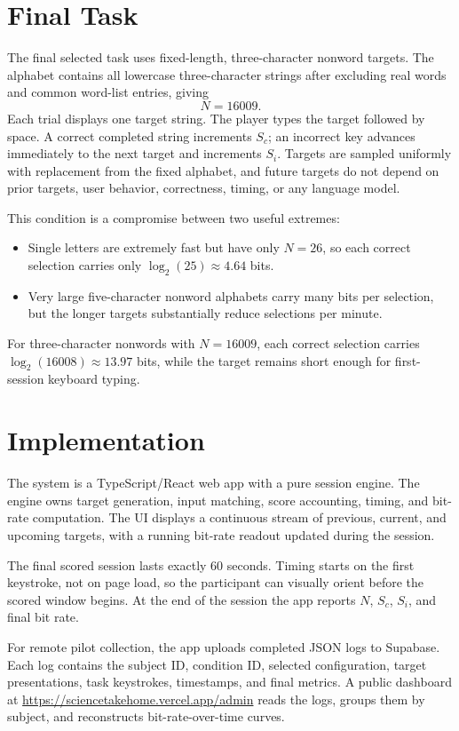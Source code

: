 \documentclass[11pt]{article}
\begin{document}
\section{Final Task}

The final selected task uses fixed-length, three-character nonword targets. The alphabet contains all lowercase three-character strings after excluding real words and common word-list entries, giving
\[
N = 16009.
\]
Each trial displays one target string. The player types the target followed by space. A correct completed string increments \(S_c\); an incorrect key advances immediately to the next target and increments \(S_i\). Targets are sampled uniformly with replacement from the fixed alphabet, and future targets do not depend on prior targets, user behavior, correctness, timing, or any language model.

This condition is a compromise between two useful extremes:
\begin{itemize}
  \item Single letters are extremely fast but have only \(N=26\), so each correct selection carries only \(\log_2(25)\approx4.64\) bits.
  \item Very large five-character nonword alphabets carry many bits per selection, but the longer targets substantially reduce selections per minute.
\end{itemize}
For three-character nonwords with \(N=16009\), each correct selection carries \(\log_2(16008)\approx13.97\) bits, while the target remains short enough for first-session keyboard typing.

\section{Implementation}

The system is a TypeScript/React web app with a pure session engine. The engine owns target generation, input matching, score accounting, timing, and bit-rate computation. The UI displays a continuous stream of previous, current, and upcoming targets, with a running bit-rate readout updated during the session.

The final scored session lasts exactly 60 seconds. Timing starts on the first keystroke, not on page load, so the participant can visually orient before the scored window begins. At the end of the session the app reports \(N\), \(S_c\), \(S_i\), and final bit rate.

For remote pilot collection, the app uploads completed JSON logs to Supabase. Each log contains the subject ID, condition ID, selected configuration, target presentations, task keystrokes, timestamps, and final metrics. A public dashboard at \url{https://sciencetakehome.vercel.app/admin} reads the logs, groups them by subject, and reconstructs bit-rate-over-time curves.
\end{document}
